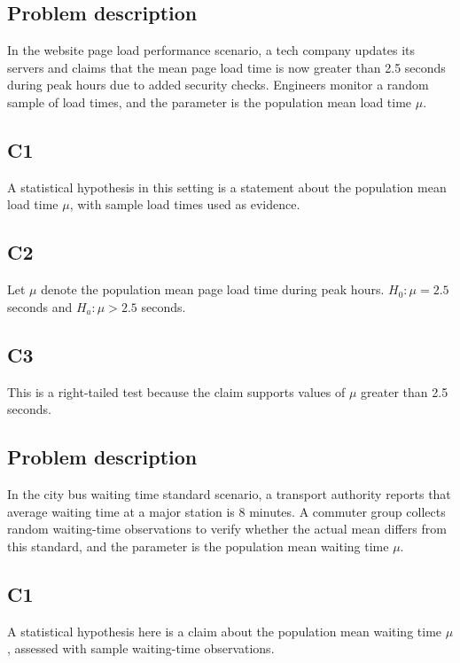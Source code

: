 \begin{ExamProblems}
		\item
		\subsection*{Problem description}
		In the website page load performance scenario, a tech company updates its servers and claims that the mean page load time is now greater than 2.5 seconds during peak hours due to added security checks. Engineers monitor a random sample of load times, and the parameter is the population mean load time \(\mu\).

		\subsection*{C1}
		A statistical hypothesis in this setting is a statement about the population mean load time \(\mu\), with sample load times used as evidence.

		\subsection*{C2}
		Let \(\mu\) denote the population mean page load time during peak hours. \(H_0\colon \mu = 2.5\) seconds and \(H_a\colon \mu > 2.5\) seconds.

		\subsection*{C3}
		This is a right-tailed test because the claim supports values of \(\mu\) greater than 2.5 seconds.

		\item
		\subsection*{Problem description}
		In the city bus waiting time standard scenario, a transport authority reports that average waiting time at a major station is 8 minutes. A commuter group collects random waiting-time observations to verify whether the actual mean differs from this standard, and the parameter is the population mean waiting time \(\mu\).

		\subsection*{C1}
		A statistical hypothesis here is a claim about the population mean waiting time \(\mu\), assessed with sample waiting-time observations.


\end{ExamProblems}
